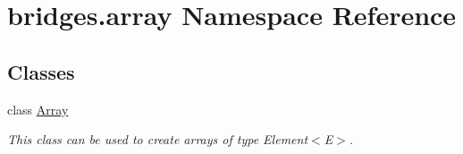 \hypertarget{namespacebridges_1_1array}{}\section{bridges.\+array Namespace Reference}
\label{namespacebridges_1_1array}
\subsection*{Classes}
\begin{DoxyCompactItemize}
\item 
class \hyperlink{classbridges_1_1array_1_1_array}{Array}
\begin{DoxyCompactList}\small\item\em This class can be used to create arrays of type Element$<$\+E$>$. \end{DoxyCompactList}\end{DoxyCompactItemize}
